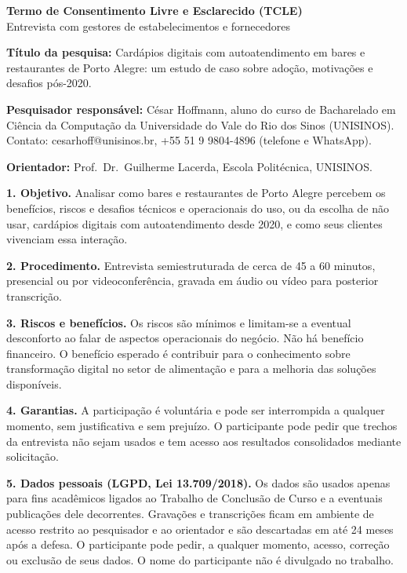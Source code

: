 \documentclass[11pt,a4paper]{article}
\begin{document}
\begin{center}
  {\large\bfseries Termo de Consentimento Livre e Esclarecido (TCLE)}\\[0.3em]
  {\small Entrevista com gestores de estabelecimentos e fornecedores}
\end{center}

\textbf{Título da pesquisa:} Cardápios digitais com autoatendimento em bares e restaurantes de Porto Alegre: um estudo de caso sobre adoção, motivações e desafios pós-2020.

\textbf{Pesquisador responsável:} César Hoffmann, aluno do curso de Bacharelado em Ciência da Computação da Universidade do Vale do Rio dos Sinos (UNISINOS). Contato: cesarhoff@unisinos.br, +55 51 9 9804-4896 (telefone e WhatsApp).

\textbf{Orientador:} Prof.\ Dr.\ Guilherme Lacerda, Escola Politécnica, UNISINOS.

\textbf{1. Objetivo.} Analisar como bares e restaurantes de Porto Alegre percebem os benefícios, riscos e desafios técnicos e operacionais do uso, ou da escolha de não usar, cardápios digitais com autoatendimento desde 2020, e como seus clientes vivenciam essa interação.

\textbf{2. Procedimento.} Entrevista semiestruturada de cerca de 45 a 60 minutos, presencial ou por videoconferência, gravada em áudio ou vídeo para posterior transcrição.

\textbf{3. Riscos e benefícios.} Os riscos são mínimos e limitam-se a eventual desconforto ao falar de aspectos operacionais do negócio. Não há benefício financeiro. O benefício esperado é contribuir para o conhecimento sobre transformação digital no setor de alimentação e para a melhoria das soluções disponíveis.

\textbf{4. Garantias.} A participação é voluntária e pode ser interrompida a qualquer momento, sem justificativa e sem prejuízo. O participante pode pedir que trechos da entrevista não sejam usados e tem acesso aos resultados consolidados mediante solicitação.

\textbf{5. Dados pessoais (LGPD, Lei 13.709/2018).} Os dados são usados apenas para fins acadêmicos ligados ao Trabalho de Conclusão de Curso e a eventuais publicações dele decorrentes. Gravações e transcrições ficam em ambiente de acesso restrito ao pesquisador e ao orientador e são descartadas em até 24 meses após a defesa. O participante pode pedir, a qualquer momento, acesso, correção ou exclusão de seus dados. O nome do participante não é divulgado no trabalho.
\end{document}

